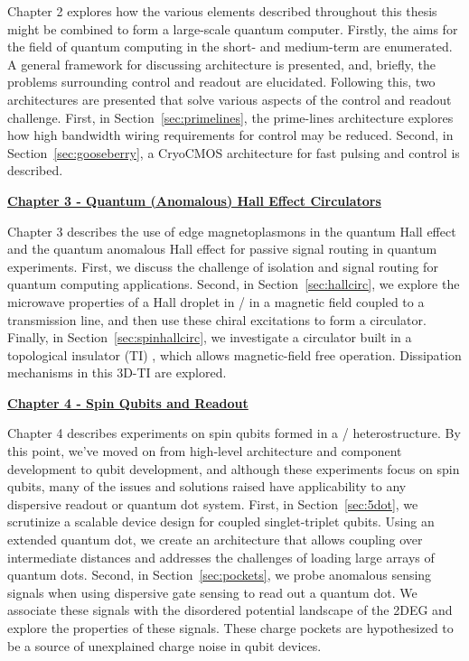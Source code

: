 \noindent
Chapter 2 explores how the various elements described throughout this thesis might be combined to form
a large-scale quantum computer. Firstly, the aims for the field of quantum computing in the short- and medium-term are
enumerated. A general framework for discussing architecture is presented, and, briefly, the problems surrounding control
and readout are elucidated. Following this, two architectures are presented that solve various aspects of the control
and readout challenge. First, in Section~\ref{sec:primelines}, the prime-lines architecture explores how high bandwidth
wiring requirements for control may be reduced. Second, in Section~\ref{sec:gooseberry}, a CryoCMOS architecture for fast
pulsing and control is described.

\medskip
\noindent\textbf{\hyperref[sec:hall]{Chapter 3 - Quantum (Anomalous) Hall Effect Circulators}}

\noindent
Chapter 3 describes the use of edge magnetoplasmons in the quantum Hall effect and the quantum anomalous Hall effect
for passive signal routing in quantum experiments. First, we discuss the challenge of isolation and signal routing
for quantum computing applications. Second, in Section~\ref{sec:hallcirc}, we explore the microwave properties of a
Hall droplet in / in a magnetic field coupled to a transmission line, and then use these chiral
excitations to form a circulator. Finally, in Section~\ref{sec:spinhallcirc}, we investigate a circulator built in a topological
insulator (TI) , which allows magnetic-field free operation. Dissipation mechanisms in this 3D-TI
are explored.

\medskip
\noindent\textbf{\hyperref[sec:spinqubit]{Chapter 4 - Spin Qubits and Readout}}

\noindent
Chapter 4 describes experiments on spin qubits formed in a / heterostructure. By this point, we've moved
on from high-level architecture and component development to qubit development, and although these experiments focus on
spin qubits, many of the issues and solutions raised have applicability to any dispersive readout or quantum dot system.
First, in Section~\ref{sec:5dot}, we scrutinize a scalable device design for coupled singlet-triplet qubits. Using an
extended quantum dot, we create an architecture that allows coupling over intermediate distances and addresses the challenges
of loading large arrays of quantum dots. Second, in Section~\ref{sec:pockets}, we probe anomalous sensing signals when
using dispersive gate sensing to read out a quantum dot. We associate these signals with the disordered potential landscape
of the 2DEG and explore the properties of these signals. These charge pockets are hypothesized to be a source of unexplained
charge noise in qubit devices.


